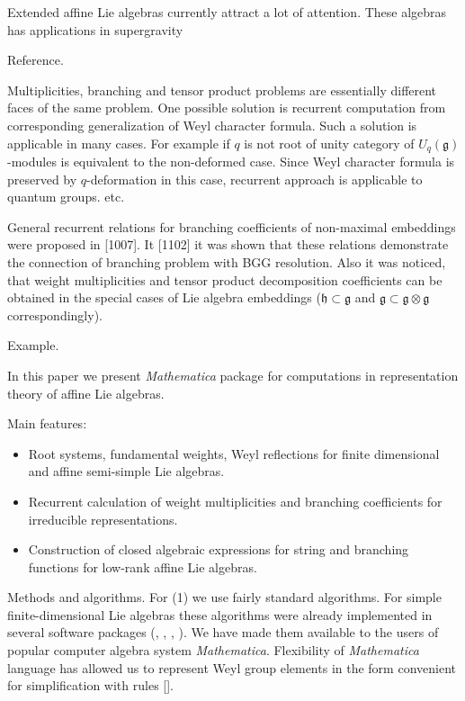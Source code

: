 \documentclass[12pt]{article}
\theoremstyle{definition}
\newcommand{\gf}{\mathfrak{g}}
\newcommand{\hf}{\mathfrak{h}}
\begin{document}
Extended affine Lie algebras currently attract a lot of attention. These algebras has applications in supergravity 

Reference.

Multiplicities, branching and tensor product problems are essentially different faces of the same problem. One possible solution is recurrent computation from corresponding generalization of Weyl character formula. Such a solution is applicable in many cases. For example if $q$ is not root of unity category of $U_{q}(\gf)$-modules is equivalent to the non-deformed case.  Since Weyl character formula is preserved by $q$-deformation in this case, recurrent approach is applicable to quantum groups. etc.

General recurrent relations for branching coefficients of non-maximal embeddings were proposed in [1007]. It [1102] it was shown that these relations demonstrate the connection of branching problem with BGG resolution. Also it was noticed, that weight multiplicities and tensor product decomposition coefficients can be obtained in the special cases of Lie algebra embeddings ($\hf\subset\gf$ and $\gf\subset\gf\otimes\gf$ correspondingly).

Example.

In this paper we present {\it Mathematica} package for computations in representation theory of affine Lie algebras. 

Main features:
\begin{itemize}
\item Root systems, fundamental weights, Weyl reflections for finite dimensional and affine semi-simple Lie algebras.
\item Recurrent calculation of weight multiplicities and branching coefficients for irreducible representations.
\item Construction of closed algebraic expressions for string and branching functions for low-rank affine Lie algebras.
\end{itemize}

Methods and algorithms.
For (1) we use fairly standard algorithms. For simple finite-dimensional Lie algebras these algorithms were already implemented in several software packages (\cite{vanleeuwen1994lsp}, \cite{stembridge2001computational}, \cite{fischbacher2002ilp}, \cite{simplie}). We have made them available to the users of popular computer algebra system {\it Mathematica}. Flexibility of {\it Mathematica} language has allowed us to represent Weyl group elements in the form convenient for simplification with rules []. 
\end{document}
